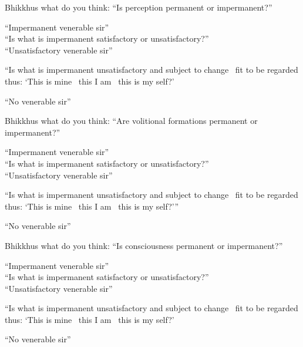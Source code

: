 \begin{english-only-nohang}
  \begin{english-only-hang}
    Bhikkhus what do you think: ``Is perception permanent or impermanent?''
  \end{english-only-hang}
  ``Impermanent venerable sir''\\
  ``Is what is impermanent satisfactory or unsatisfactory?''\\
  ``Unsatisfactory venerable sir''\\
  \begin{english-hangtogether}
    ``Is what is impermanent unsatisfactory and subject to change \breathmark\ fit to be regarded thus: `This is mine \breathmark\ this I am \breathmark\ this is my self?'
  \end{english-hangtogether}
  ``No venerable sir''
\end{english-only-nohang}

\begin{english-only-nohang}
  \begin{english-only-hang}
    Bhikkhus what do you think: ``Are volitional formations permanent or impermanent?''
  \end{english-only-hang}
  ``Impermanent venerable sir''\\
  ``Is what is impermanent satisfactory or unsatisfactory?''\\
  ``Unsatisfactory venerable sir''
  \begin{english-hangtogether}
    ``Is what is impermanent unsatisfactory and subject to change \breathmark\ fit to be regarded thus: `This is mine \breathmark\ this I am \breathmark\ this is my self?'''
  \end{english-hangtogether}
  ``No venerable sir''
\end{english-only-nohang}

\begin{english-only-nohang}
  \begin{english-only-hang}
    Bhikkhus what do you think: ``Is consciousness permanent or impermanent?''
  \end{english-only-hang}
  ``Impermanent venerable sir''\\
  ``Is what is impermanent satisfactory or unsatisfactory?''\\
  ``Unsatisfactory venerable sir''\\
  \begin{english-hangtogether}
    ``Is what is impermanent unsatisfactory and subject to change \breathmark\ fit to be regarded thus: `This is mine \breathmark\ this I am \breathmark\ this is my self?'
  \end{english-hangtogether}
  ``No venerable sir''
\end{english-only-nohang}

